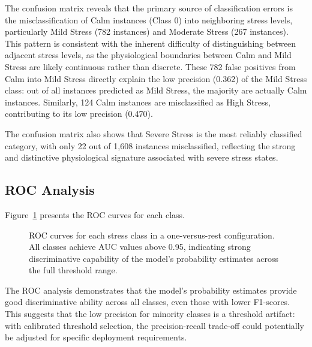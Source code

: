 \documentclass[12pt,letterpaper]{report}
\begin{document}
The confusion matrix reveals that the primary source of classification errors is the misclassification of Calm instances (Class 0) into neighboring stress levels, particularly Mild Stress (782 instances) and Moderate Stress (267 instances). This pattern is consistent with the inherent difficulty of distinguishing between adjacent stress levels, as the physiological boundaries between Calm and Mild Stress are likely continuous rather than discrete. These 782 false positives from Calm into Mild Stress directly explain the low precision (0.362) of the Mild Stress class: out of all instances predicted as Mild Stress, the majority are actually Calm instances. Similarly, 124 Calm instances are misclassified as High Stress, contributing to its low precision (0.470).

The confusion matrix also shows that Severe Stress is the most reliably classified category, with only 22 out of 1,608 instances misclassified, reflecting the strong and distinctive physiological signature associated with severe stress states.

\subsection{ROC Analysis}

Figure~\ref{fig:roc_curves} presents the ROC curves for each class.

\begin{figure}[H]
\centering
{}
\caption[ROC curves for NeuroFusionGPT]{ROC curves for each stress class in a one-versus-rest configuration. All classes achieve AUC values above 0.95, indicating strong discriminative capability of the model's probability estimates across the full threshold range.}
\label{fig:roc_curves}
\end{figure}

The ROC analysis demonstrates that the model's probability estimates provide good discriminative ability across all classes, even those with lower F1-scores. This suggests that the low precision for minority classes is a threshold artifact: with calibrated threshold selection, the precision-recall trade-off could potentially be adjusted for specific deployment requirements.
\end{document}
